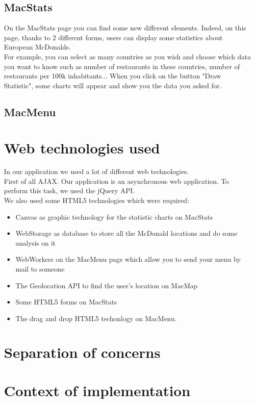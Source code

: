 \documentclass[12pt]{article}
\begin{document}
        \newpage

        {\color{color_subsection}\subsection{MacStats}}
        \noindent On the MacStats page you can find some new different elements.
        Indeed, on this page, thanks to 2 different forms, users can display
        some statistics about European McDonalds.\\

        \noindent For example, you can select as many countries as you wish
        and choose which data you want to know such as number of restaurants
        in these countries, number of restaurants per 100k inhabitants... When
        you click on the button "Draw  Statistic", some charts will appear and
        show you the data you asked for.\\
        {\color{color_subsection}\subsection{MacMenu}}

    {\color{color_section}\section{Web technologies used}}

    \noindent In our application we used a lot of different web technologies.\\

    \noindent First of all AJAX. Our application is an asynchronous web application.
    To perform this task, we used the jQuery API.\\

    \noindent We also used some HTML5 technologies which were required:\\
    \begin{itemize}
        \item Canvas as graphic technology for the statistic charts on MacStats
        \item WebStorage as database to store all the McDonald locations and do some analysis on it
        \item WebWorkers on the MacMenu page which allow you to send your menu by mail to someone
        \item The Geolocation API to find the user's location on MacMap
        \item Some HTML5 forms on MacStats
        \item The drag and drop HTML5 techonlogy on MacMenu.
    \end{itemize}


    {\color{color_section}\section{Separation of concerns}}

    {\color{color_section}\section{Context of implementation}}
\end{document}
